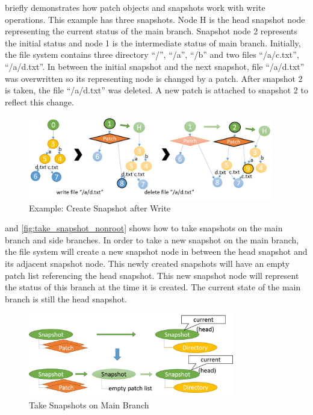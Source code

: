 	 briefly demonstrates how patch objects and snapshots work with write operations. This example has three snapshots. Node H is the head snapshot node representing the current status of the main branch. Snapshot node 2 represents the initial status and node 1 is the intermediate status of main branch. Initially, the file system contains three directory ``/'', ``/a'', ``/b'' and two files ``/a/c.txt'', ``/a/d.txt''. In between the initial snapshot and the next snapshot, file ``/a/d.txt'' was overwritten so its representing node is changed by a patch. After snapshot 2 is taken, the file ``/a/d.txt'' was deleted. A new patch is attached to snapshot 2 to reflect this change.

\begin{figure}[t]
\centering
\includegraphics[width=0.95\textwidth]{Chapter-4/figs/fig26.png}
\caption{Example: Create Snapshot after Write}
\label{fig:create_snapshots}
\end{figure}

     and \ref{fig:take_snapshot_nonroot} shows how to take snapshots on the main branch and side branches. In order to take a new snapshot on the main branch, the file system will create a new snapshot node in between the head snapshot and its adjacent snapshot node. This newly created snapshots will have an empty patch list referencing the head snapshot. This new snapshot node will represent the status of this branch at the time it is created. The current state of the main branch is still the head snapshot.

\begin{figure}[t]
\centering
\includegraphics[width=0.8\textwidth]{Chapter-4/figs/fig20.png}
\caption{Take Snapshots on Main Branch}
\label{fig:take_snapshot_root}
\end{figure}
    
